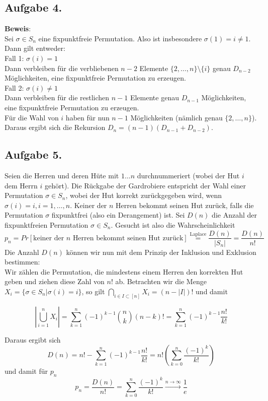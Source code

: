 \documentclass[11pt,a4paper,ngerman]{article}
\begin{document}
\subsection*{Aufgabe 4.}
\textbf{Beweis}: \\
Sei $\sigma \in S_{n}$ eine fixpunktfreie Permutation. Also ist insbesondere $\sigma(1) = i \neq 1$.
Dann gilt entweder: \\
Fall 1: $\sigma(i) = 1$ \\
Dann verbleiben für die verbliebenen $n-2$ Elemente $\{ 2,\ldots,n \} \setminus \{i \}$ genau $D_{n-2}$ Möglichkeiten, eine fixpunktfreie Permutation zu erzeugen. \\
Fall 2: $\sigma(i) \neq 1$ \\
Dann verbleiben für die restlichen $n-1$ Elemente genau $D_{n-1}$ Möglichkeiten, eine fixpunktfreie Permutation zu erzeugen.\\

Für die Wahl von $i$ haben für nun $n-1$ Möglichkeiten (nämlich genau $\{2,\ldots,n \}$). Daraus ergibt sich die Rekursion $D_n = (n-1) (D_{n-1} + D_{n-2})$.
\subsection*{Aufgabe 5.}
Seien die Herren und deren Hüte mit $1 \ldots n$ durchnummeriert (wobei der Hut $i$ dem Herrn $i$ gehört).
Die Rückgabe der Gardrobiere entspricht der Wahl einer Permutation $\sigma \in S_n$, wobei
der Hut korrekt zurückgegeben wird, wenn $\sigma(i) = i, i = 1,\ldots,n$. Keiner der $n$ Herren bekommt
seinen Hut zurück, falls die Permutation $\sigma$ fixpunktfrei (also ein Derangement) ist. Sei $D(n)$ die
Anzahl der fixpunktfreien Permutation $\sigma \in S_n$.
Gesucht ist also die Wahrscheinlichkeit
$$p_n = Pr[\text{keiner der $n$ Herren bekommt seinen Hut zurück}] \stackrel{\text{Laplace}}{=} \frac{D(n)}{|S_n|} = \frac{D(n)}{n!}$$
Die Anzahl $D(n)$ können wir nun mit dem Prinzip der Inklusion und Exklusion bestimmen: \\
Wir zählen die Permutation, die mindestens einem Herren den korrekten Hut geben und ziehen diese Zahl von $n!$ ab. Betrachten wir die Menge $X_i = \{\sigma \in S_n | \sigma(i) = i \}$, so gilt $\bigcap_{i \in I \subset [n]} X_i = (n - |I|)!$ und damit

$$ |\bigcup_{i = 1}^n X_i | = \sum_{k=1}^n (-1)^{k-1} \binom{n}{k} (n-k)! =  \sum_{k=1}^n (-1)^{k-1} \frac{n!}{k!}$$

Daraus ergibt sich 
$$D(n) = n! - \sum_{k=1}^n (-1)^{k-1} \frac{n!}{k!} = n! \left(\sum_{k=0}^n \frac{ (-1)^{k} }{k!} \right)$$
und damit für $p_n$
$$ p_n = \frac{D(n)}{n!} = \sum_{k=0}^n \frac{ (-1)^{k} }{k!} \stackrel{n \to \infty}{\longrightarrow} \frac{1}{e}$$
\label{LastPage}
\end{document}
